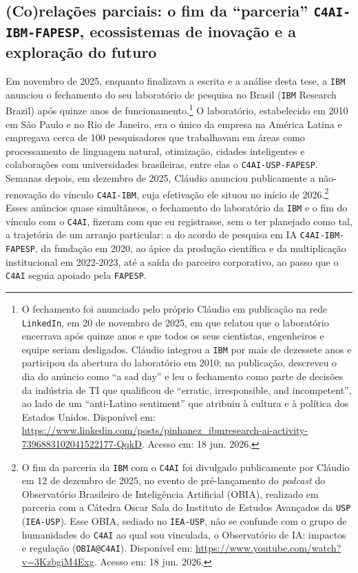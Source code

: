 \subsection{(Co)relações parciais: o fim da \enquote{parceria} \texttt{C4AI-IBM-FAPESP}, ecossistemas de inovação e a exploração do futuro}
\label{correlacoes-parciais}

Em novembro de 2025, enquanto finalizava a escrita e a análise desta tese, a \texttt{IBM} anunciou o fechamento do seu laboratório de pesquisa no Brasil (\texttt{IBM} Research Brazil) após quinze anos de funcionamento.\footnote{O fechamento foi anunciado pelo próprio Cláudio em publicação na rede \texttt{LinkedIn}, em 20 de novembro de 2025, em que relatou que o laboratório encerrava após quinze anos e que todos os seus cientistas, engenheiros e equipe seriam desligados. Cláudio integrou a \texttt{IBM} por mais de dezessete anos e participou da abertura do laboratório em 2010; na publicação, descreveu o dia do anúncio como \enquote{a sad day} e leu o fechamento como parte de decisões da indústria de TI que qualificou de \enquote{erratic, irresponsible, and incompetent}, ao lado de um \enquote{anti-Latino sentiment} que atribuiu à cultura e à política dos Estados Unidos. Disponível em: \url{https://www.linkedin.com/posts/pinhanez_ibmresearch-ai-activity-7396883102041522177-QqkD}. Acesso em: 18 jun. 2026.} O laboratório, estabelecido em 2010 em São Paulo e no Rio de Janeiro, era o único da empresa na América Latina e empregava cerca de 100 pesquisadores que trabalhavam em áreas como processamento de linguagem natural, otimização, cidades inteligentes e colaborações com universidades brasileiras, entre elas o \texttt{C4AI-USP-FAPESP}. Semanas depois, em dezembro de 2025, Cláudio anunciou publicamente a não-renovação do vínculo \texttt{C4AI-IBM}, cuja efetivação ele situou no início de 2026.\footnote{O fim da parceria da \texttt{IBM} com o \texttt{C4AI} foi divulgado publicamente por Cláudio em 12 de dezembro de 2025, no evento de pré-lançamento do \textit{podcast} do Observatório Brasileiro de Inteligência Artificial (OBIA), realizado em parceria com a Cátedra Oscar Sala do Instituto de Estudos Avançados da \texttt{USP} (\texttt{IEA-USP}). Esse OBIA, sediado no \texttt{IEA-USP}, não se confunde com o grupo de humanidades do \texttt{C4AI} ao qual sou vinculada, o Observatório de IA: impactos e regulação (\texttt{OBIA@C4AI}). Disponível em: \url{https://www.youtube.com/watch?v=3KzbgiM4Exg}. Acesso em: 18 jun. 2026.} Esses anúncios quase simultâneos, o fechamento do laboratório da \texttt{IBM} e o fim do vínculo com o \texttt{C4AI}, fizeram com que eu registrasse, sem o ter planejado como tal, a trajetória de um arranjo particular: a do acordo de pesquisa em IA \texttt{C4AI-IBM-FAPESP}, da fundação em 2020, ao ápice da produção científica e da multiplicação institucional em 2022-2023, até a saída do parceiro corporativo, ao passo que o \texttt{C4AI} seguia apoiado pela \texttt{FAPESP}. %

